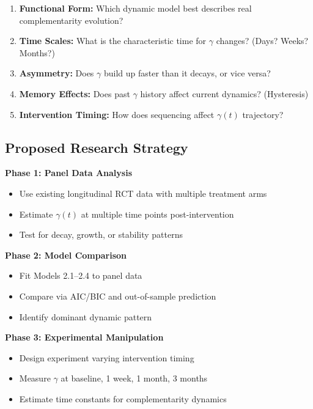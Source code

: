 \begin{enumerate}
    \item \textbf{Functional Form:} Which dynamic model best describes real complementarity evolution?

    \item \textbf{Time Scales:} What is the characteristic time for $\gamma$ changes? (Days? Weeks? Months?)

    \item \textbf{Asymmetry:} Does $\gamma$ build up faster than it decays, or vice versa?

    \item \textbf{Memory Effects:} Does past $\gamma$ history affect current dynamics? (Hysteresis)

    \item \textbf{Intervention Timing:} How does sequencing affect $\gamma(t)$ trajectory?
\end{enumerate}

\subsection{Proposed Research Strategy}

\begin{tcolorbox}[colback=green!5!white,colframe=green!75!black,title=\textbf{Research Protocol for RQ2}]
\textbf{Phase 1: Panel Data Analysis}
\begin{itemize}[noitemsep]
    \item Use existing longitudinal RCT data with multiple treatment arms
    \item Estimate $\gamma(t)$ at multiple time points post-intervention
    \item Test for decay, growth, or stability patterns
\end{itemize}

\textbf{Phase 2: Model Comparison}
\begin{itemize}[noitemsep]
    \item Fit Models 2.1--2.4 to panel data
    \item Compare via AIC/BIC and out-of-sample prediction
    \item Identify dominant dynamic pattern
\end{itemize}

\textbf{Phase 3: Experimental Manipulation}
\begin{itemize}[noitemsep]
    \item Design experiment varying intervention timing
    \item Measure $\gamma$ at baseline, 1 week, 1 month, 3 months
    \item Estimate time constants for complementarity dynamics
\end{itemize}
\end{tcolorbox}

